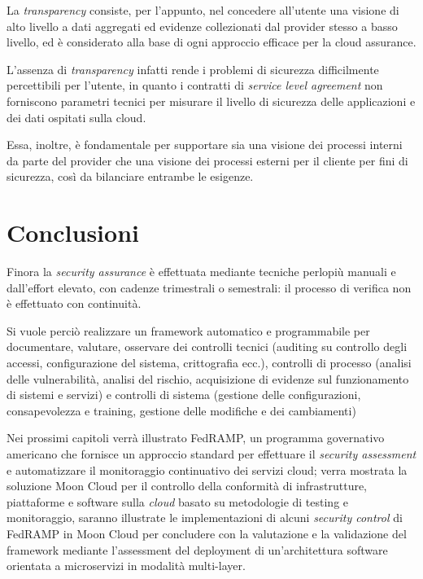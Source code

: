 \documentclass[../main.tex]{subfiles}
\begin{document}
La \textit{transparency} consiste, per l'appunto, nel concedere all'utente una visione di alto livello a dati aggregati ed evidenze collezionati dal provider stesso a basso livello, ed è considerato alla base di ogni approccio efficace per la cloud assurance\cite{6814039}\cite{6375614}.


L'assenza di \textit{transparency} infatti rende i problemi di sicurezza difficilmente percettibili per l'utente\cite{Ardagna:2015:SAC:2808687.2767005}, in quanto i contratti di \textit{service level agreement} non forniscono parametri tecnici per misurare il livello di sicurezza delle applicazioni e dei dati ospitati sulla cloud\cite{6684427}.

Essa, inoltre, è fondamentale per supportare sia una visione dei processi interni da parte del provider che una visione dei processi esterni per il cliente per fini di sicurezza, così da bilanciare entrambe le esigenze\cite{Ardagna:2015:SAC:2808687.2767005}.

\section{Conclusioni}

Finora la \textit{security assurance} è effettuata mediante tecniche perlopiù manuali e dall'effort elevato, con cadenze trimestrali o semestrali: il processo di verifica non è effettuato con continuità.

Si vuole perciò realizzare un framework automatico e programmabile per documentare, valutare, osservare dei controlli tecnici (auditing su controllo degli accessi, configurazione del sistema, crittografia ecc.), controlli di processo (analisi delle vulnerabilità, analisi del rischio, acquisizione di evidenze sul funzionamento di sistemi e servizi) e controlli di sistema (gestione delle configurazioni, consapevolezza e training, gestione delle modifiche e dei cambiamenti)


Nei prossimi capitoli verrà illustrato FedRAMP, un programma governativo americano che fornisce un approccio standard per effettuare il \textit{security assessment} e automatizzare il monitoraggio continuativo dei servizi cloud; verra mostrata la soluzione Moon Cloud per il controllo della conformità di infrastrutture, piattaforme e software sulla \textit{cloud} basato su metodologie di testing e monitoraggio, saranno illustrate le implementazioni di alcuni \textit{security control} di FedRAMP in Moon Cloud per concludere con la valutazione e la validazione del framework mediante l'assessment del deployment di un'architettura software orientata a microservizi in modalità multi-layer.
\end{document}
